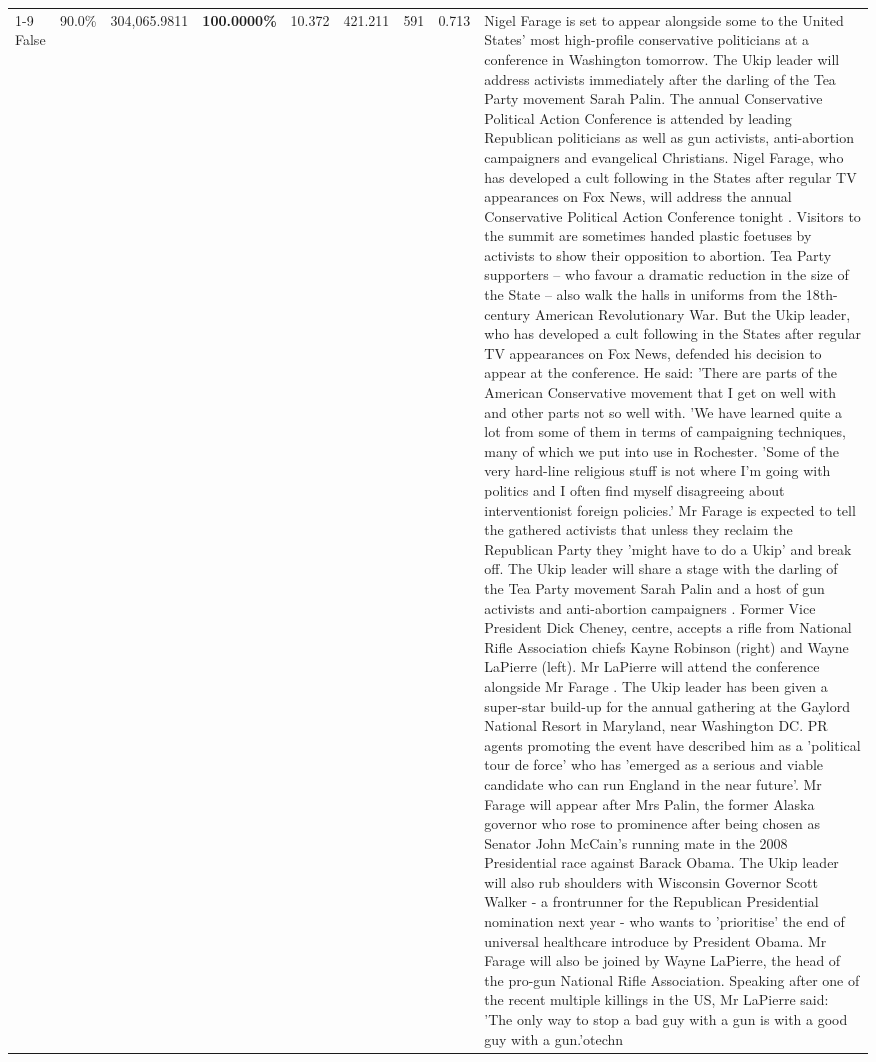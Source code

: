 \begin{table}[H]
\begin{tabular}{lllrlllll}
\cline{1-9}
False & 90.0\% & 304,065.9811 & \bfseries \color{red} 100.0000\% & 10.372 & 421.211 & 591 & 0.713 & Nigel Farage is set to appear alongside some to the United States' most high-profile conservative politicians at a conference in Washington tomorrow. The Ukip leader will address activists immediately after the darling of the Tea Party movement Sarah Palin. The annual Conservative Political Action Conference is attended by leading Republican politicians as well as gun activists, anti-abortion campaigners and evangelical Christians. Nigel Farage, who has developed a cult following in the States after regular TV appearances on Fox News, will address the annual Conservative Political Action Conference tonight . Visitors to the summit are sometimes handed plastic foetuses by activists to show their opposition to abortion. Tea Party supporters – who favour a dramatic reduction in the size of the State – also walk the halls in uniforms from the 18th-century American Revolutionary War. But the Ukip leader, who has developed a cult following in the States after regular TV appearances on Fox News, defended his decision to appear at the conference. He said: 'There are parts of the American Conservative movement that I get on well with and other parts not so well with. 'We have learned quite a lot from some of them in terms of campaigning techniques, many of which we put into use in Rochester. 'Some of the very hard-line religious stuff is not where I'm going with politics and I often find myself disagreeing about interventionist foreign policies.' Mr Farage is expected to tell the gathered activists that unless they reclaim the Republican Party they 'might have to do a Ukip' and break off. The Ukip leader will share a stage with the darling of the Tea Party movement Sarah Palin and a host of gun activists and anti-abortion campaigners . Former Vice President Dick Cheney, centre, accepts a rifle from National Rifle Association chiefs Kayne Robinson (right) and Wayne LaPierre (left). Mr LaPierre will attend the conference alongside Mr Farage . The Ukip leader has been given a super-star build-up for the annual gathering at the Gaylord National Resort in Maryland, near Washington DC. PR agents promoting the event have described him as a 'political tour de force' who has 'emerged as a serious and viable candidate who can run England in the near future'. Mr Farage will appear after Mrs Palin, the former Alaska governor who rose to prominence after being chosen as Senator John McCain's running mate in the 2008 Presidential race against Barack Obama. The Ukip leader will also rub shoulders with Wisconsin Governor Scott Walker - a frontrunner for the Republican Presidential nomination next year - who wants to 'prioritise' the end of universal healthcare introduce by President Obama. Mr Farage will also be joined by Wayne LaPierre, the head of the pro-gun National Rifle Association. Speaking after one of the recent multiple killings in the US, Mr LaPierre said: 'The only way to stop a bad guy with a gun is with a good guy with a gun.'otechn \\

\end{tabular}
\end{table}
